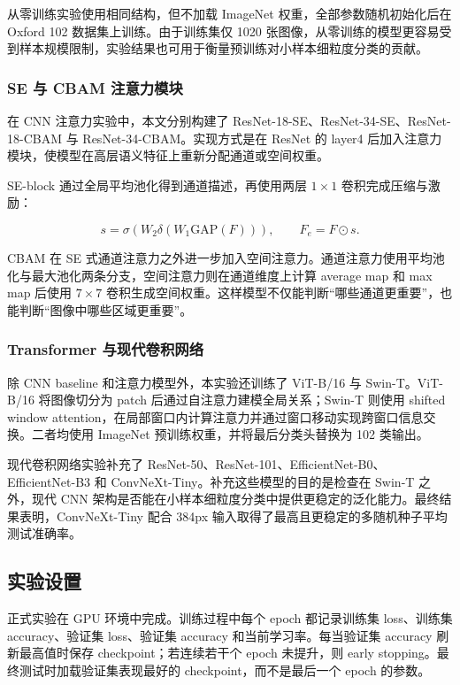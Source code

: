 \documentclass[UTF8,a4paper,11pt]{ctexart}
\begin{document}
从零训练实验使用相同结构，但不加载 ImageNet 权重，全部参数随机初始化后在 Oxford 102 数据集上训练。由于训练集仅 1020 张图像，从零训练的模型更容易受到样本规模限制，实验结果也可用于衡量预训练对小样本细粒度分类的贡献。

\subsubsection*{SE 与 CBAM 注意力模块}

在 CNN 注意力实验中，本文分别构建了 ResNet-18-SE、ResNet-34-SE、ResNet-18-CBAM 与 ResNet-34-CBAM。实现方式是在 ResNet 的 layer4 后加入注意力模块，使模型在高层语义特征上重新分配通道或空间权重。

SE-block 通过全局平均池化得到通道描述，再使用两层 \(1 \times 1\) 卷积完成压缩与激励：

\begin{equation}
    s = \sigma(W_2 \delta(W_1 \mathrm{GAP}(F))), \qquad F_e = F \odot s.
\end{equation}

CBAM 在 SE 式通道注意力之外进一步加入空间注意力。通道注意力使用平均池化与最大池化两条分支，空间注意力则在通道维度上计算 average map 和 max map 后使用 \(7 \times 7\) 卷积生成空间权重。这样模型不仅能判断“哪些通道更重要”，也能判断“图像中哪些区域更重要”。

\subsubsection*{Transformer 与现代卷积网络}

除 CNN baseline 和注意力模型外，本实验还训练了 ViT-B/16 与 Swin-T。ViT-B/16 将图像切分为 patch 后通过自注意力建模全局关系；Swin-T 则使用 shifted window attention，在局部窗口内计算注意力并通过窗口移动实现跨窗口信息交换。二者均使用 ImageNet 预训练权重，并将最后分类头替换为 102 类输出。

现代卷积网络实验补充了 ResNet-50、ResNet-101、EfficientNet-B0、EfficientNet-B3 和 ConvNeXt-Tiny。补充这些模型的目的是检查在 Swin-T 之外，现代 CNN 架构是否能在小样本细粒度分类中提供更稳定的泛化能力。最终结果表明，ConvNeXt-Tiny 配合 384px 输入取得了最高且更稳定的多随机种子平均测试准确率。

\subsection{实验设置}

正式实验在 GPU 环境中完成。训练过程中每个 epoch 都记录训练集 loss、训练集 accuracy、验证集 loss、验证集 accuracy 和当前学习率。每当验证集 accuracy 刷新最高值时保存 checkpoint；若连续若干个 epoch 未提升，则 early stopping。最终测试时加载验证集表现最好的 checkpoint，而不是最后一个 epoch 的参数。
\end{document}
